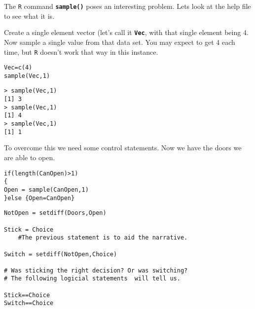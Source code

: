 \documentclass[a4paper,12pt]{article}
\begin{document}
The \texttt{R} command \texttt{\textbf{sample()}} poses an interesting problem. Lets look at the help file to see what it is.

Create a single element vector (let's call it \texttt{\textbf{Vec}}, with that single element being 4. Now sample a single value from that data set. You may expect to get 4 each time, but \texttt{R} doesn’t work that way in this instance.

\begin{framed}
\begin{verbatim}
Vec=c(4)
sample(Vec,1)
\end{verbatim} 
\end{framed}

\begin{verbatim}
> sample(Vec,1)
[1] 3
> sample(Vec,1)
[1] 4
> sample(Vec,1)
[1] 1
\end{verbatim}
To overcome this we need some control statements. Now we have the doors we are able to open.

\begin{framed}
\begin{verbatim}
if(length(CanOpen)>1)
{
Open = sample(CanOpen,1) 
}else {Open=CanOpen}
\end{verbatim} 
\end{framed}


\begin{framed}
\begin{verbatim}
NotOpen = setdiff(Doors,Open)

Stick = Choice        
    #The previous statement is to aid the narrative. 

Switch = setdiff(NotOpen,Choice)

# Was sticking the right decision? Or was switching?
# The following logicial statements  will tell us.

Stick==Choice
Switch==Choice
\end{verbatim} 
\end{framed}
\end{document}
